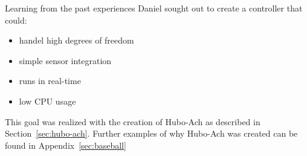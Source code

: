 Learning from the past experiences Daniel sought out to create a controller that could:
\begin{itemize}
\item handel high degrees of freedom
\item simple sensor integration
\item runs in real-time
\item low CPU usage
\end{itemize}

This goal was realized with the creation of Hubo-Ach as described in Section~\ref{sec:hubo-ach}. 
Further examples of why Hubo-Ach was created can be found in Appendix~\ref{sec:baseball}
